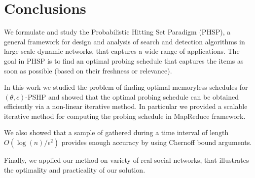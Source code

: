 \section{Conclusions}\label{sec:concl}
We formulate and study the Probabilistic Hitting Set Paradigm (PHSP),
a general framework for design and analysis of search and detection algorithms
in large scale dynamic networks, that  captures a wide range of applications. The goal in PHSP is to find an optimal probing schedule that captures the items as soon as possible (based on their freshness or relevance).

In this work we studied the problem of finding optimal memoryless schedules for $(\theta,c)$-PSHP and showed that the optimal probing schedule can be obtained efficiently via a non-linear iterative method. In particular we provided a scalable iterative method for computing the probing schedule in MapReduce framework.

We also showed that a sample of gathered during a time interval of length $O(\log(n)/\epsilon^2)$ provides enough accuracy by using Chernoff bound arguments.

Finally, we applied our method on variety of real social networks, that illustrates the optimality and practicality of our solution.

